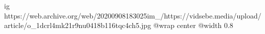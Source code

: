  
 
 
 
 

\ifcmt
  ig https://web.archive.org/web/20200908183025im_/https://vidsebe.media/upload/article/o_1dcrl4mk21r9nu0418b116tqc4ch5.jpg
  @wrap center
  @width 0.8
\fi
